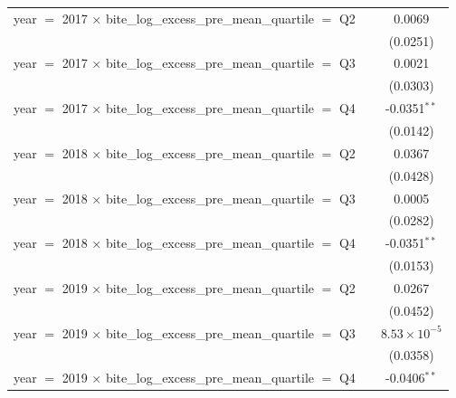 \begin{tabular}{lcc}
   year $=$ 2017 $\times$ bite\_log\_excess\_pre\_mean\_quartile $=$ Q2       &                          & 0.0069\\   
                                                                              &                          & (0.0251)\\   
   year $=$ 2017 $\times$ bite\_log\_excess\_pre\_mean\_quartile $=$ Q3       &                          & 0.0021\\   
                                                                              &                          & (0.0303)\\   
   year $=$ 2017 $\times$ bite\_log\_excess\_pre\_mean\_quartile $=$ Q4       &                          & -0.0351$^{**}$\\   
                                                                              &                          & (0.0142)\\   
   year $=$ 2018 $\times$ bite\_log\_excess\_pre\_mean\_quartile $=$ Q2       &                          & 0.0367\\   
                                                                              &                          & (0.0428)\\   
   year $=$ 2018 $\times$ bite\_log\_excess\_pre\_mean\_quartile $=$ Q3       &                          & 0.0005\\   
                                                                              &                          & (0.0282)\\   
   year $=$ 2018 $\times$ bite\_log\_excess\_pre\_mean\_quartile $=$ Q4       &                          & -0.0351$^{**}$\\   
                                                                              &                          & (0.0153)\\   
   year $=$ 2019 $\times$ bite\_log\_excess\_pre\_mean\_quartile $=$ Q2       &                          & 0.0267\\   
                                                                              &                          & (0.0452)\\   
   year $=$ 2019 $\times$ bite\_log\_excess\_pre\_mean\_quartile $=$ Q3       &                          & $8.53\times 10^{-5}$\\    
                                                                              &                          & (0.0358)\\   
   year $=$ 2019 $\times$ bite\_log\_excess\_pre\_mean\_quartile $=$ Q4       &                          & -0.0406$^{**}$\\   

\end{tabular}
